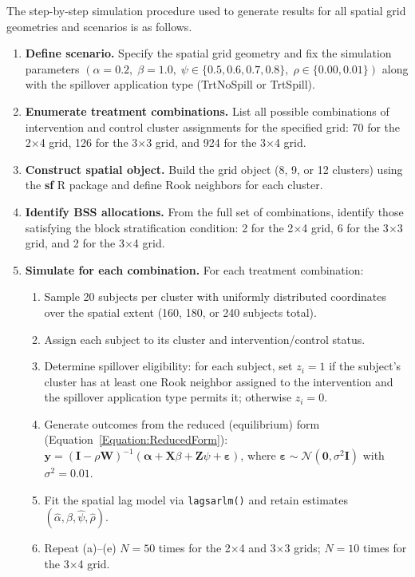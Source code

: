 \documentclass{article}[11pt]
\begin{document}
The step-by-step simulation procedure used to generate results for all spatial grid geometries and scenarios is as follows.

\begin{enumerate}
    \item\label{AppStep:Define} \textbf{Define scenario.} Specify the spatial grid geometry and fix the simulation parameters $(\alpha = 0.2,\; \beta = 1.0,\; \psi \in \{0.5, 0.6, 0.7, 0.8\},\; \rho \in \{0.00, 0.01\})$ along with the spillover application type (TrtNoSpill or TrtSpill).

    \item \textbf{Enumerate treatment combinations.} List all possible combinations of intervention and control cluster assignments for the specified grid: 70 for the 2$\times$4 grid, 126 for the 3$\times$3 grid, and 924 for the 3$\times$4 grid.

    \item \textbf{Construct spatial object.} Build the grid object (8, 9, or 12 clusters) using the \textbf{sf} R package\cite{pebesma_simple_2018} and define Rook neighbors for each cluster.

    \item \textbf{Identify BSS allocations.} From the full set of combinations, identify those satisfying the block stratification condition: 2 for the 2$\times$4 grid, 6 for the 3$\times$3 grid, and 2 for the 3$\times$4 grid.

    \item\label{AppStep:Sim} \textbf{Simulate for each combination.} For each treatment combination:
    \begin{enumerate}
        \item Sample 20 subjects per cluster with uniformly distributed coordinates over the spatial extent (160, 180, or 240 subjects total).
        \item Assign each subject to its cluster and intervention/control status.
        \item Determine spillover eligibility: for each subject, set $z_i = 1$ if the subject's cluster has at least one Rook neighbor assigned to the intervention and the spillover application type permits it; otherwise $z_i = 0$.
        \item Generate outcomes from the reduced (equilibrium) form (Equation~\ref{Equation:ReducedForm}): $\mathbf{y} = (\mathbf{I}-\rho \mathbf{W})^{-1}(\boldsymbol\alpha + \mathbf{X}\beta + \mathbf{Z}\psi + \boldsymbol\varepsilon)$, where $\boldsymbol\varepsilon \sim \mathcal{N}(\mathbf{0}, \sigma^2\mathbf{I})$ with $\sigma^2 = 0.01$.
        \item Fit the spatial lag model via \texttt{lagsarlm()} and retain estimates $(\hat\alpha, \hat\beta, \hat\psi, \hat\rho)$.
        \item Repeat (a)--(e) $N = 50$ times for the 2$\times$4 and 3$\times$3 grids; $N = 10$ times for the 3$\times$4 grid.
    \end{enumerate}


\end{enumerate}
\end{document}
